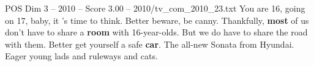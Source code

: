 \begin{textsample}{POS Dim 3 – 2010 – Score 3.00 – 2010/tv\_com\_2010\_23.txt}  \label{ex:f3_pos_041}
You are 16, going on 17, baby, it 's time to think.
Better beware, be canny.
Thankfully, \textbf{most} of us don't have to share a \textbf{room} with 16-year-olds.
But we do have to share the road with them.
Better get yourself a safe \textbf{car}.
The all-new Sonata from Hyundai.
Eager young lads and ruleways and cats.

\end{textsample}
